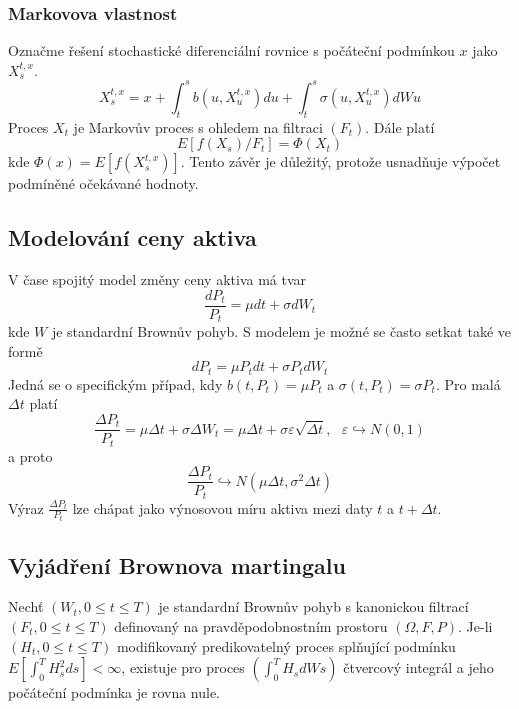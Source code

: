 \documentclass[a4paper]{book}
\begin{document}
\subsubsection{Markovova vlastnost}

Označme řešení stochastické diferenciální rovnice s počáteční podmínkou $x$ jako $X_s^{t,x}$.
\begin{equation*}
X_s^{t,x} = x + \int_t^s b(u, X_u^{t,x})du + \int_t^s \sigma(u, X_u^{t,x})d W u
\end{equation*}
Proces $X_t$ je Markovův proces s ohledem na filtraci $(F_t)$. Dále platí
\begin{equation*}
E[f(X_s)/F_t] = \Phi(X_t)
\end{equation*}
kde $\Phi(x) = E[f(X_s^{t,x})]$. Tento závěr je důležitý, protože usnadňuje výpočet podmíněné očekávané hodnoty.

\subsection{Modelování ceny aktiva}

V čase spojitý model změny ceny aktiva má tvar
\begin{equation*}
\frac{d P_t}{P_t} = \mu dt + \sigma d W_t
\end{equation*}
kde $W$ je standardní Brownův pohyb. S modelem je možné se často setkat také ve formě
\begin{equation*}
d P_t = \mu P_t dt + \sigma P_t d W_t
\end{equation*}
Jedná se o specifickým případ, kdy $b(t,P_t) = \mu P_t$ a $\sigma(t, P_t) = \sigma P_t$. Pro malá $\Delta t$ platí
\begin{equation*}
\frac{\Delta P_t}{P_t} = \mu \Delta t + \sigma \Delta W_t = \mu \Delta t + \sigma \varepsilon \sqrt{\Delta t}, ~~~ \varepsilon \hookrightarrow N(0,1)
\end{equation*}
a proto
\begin{equation*}
\frac{\Delta P_t}{P_t} \hookrightarrow N(\mu \Delta t, \sigma^2 \Delta t)
\end{equation*}
Výraz $\frac{\Delta P_t}{P_t}$ lze chápat jako výnosovou míru aktiva mezi daty $t$ a $t + \Delta t$.

\subsection{Vyjádření Brownova martingalu}

Nechť $(W_t, 0 \le t \le T)$ je standardní Brownův pohyb s kanonickou filtrací $(F_t, 0 \le t \le T)$ definovaný na pravděpodobnostním prostoru $(\Omega, F, P)$. Je-li $(H_t, 0 \le t \le T)$ modifikovaný predikovatelný proces splňující podmínku $E[\int_0^T H_s^2ds] < \infty$, existuje pro proces $(\int_0^T H_s d Ws)$ čtvercový integrál a jeho počáteční podmínka je rovna nule.
\end{document}

